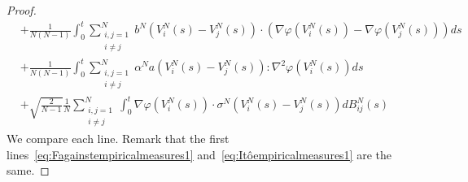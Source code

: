 \documentclass[10pt,a4paper]{amsart}
\begin{document}
\begin{proof}
\begin{align}
       &+ \frac{1}{N(N-1)}\int_0^t \sum_{\substack{i,j=1\\ i\neq j}}^N  b^N\left(V^N_i(s) -V^N_j(s)\right) \cdot (\nabla\varphi\left(V^N_i(s)\right)-\nabla\varphi\left(V^N_j(s)\right)) ds\ \\
       \label{eq:Itôempiricalmeasures3}
       &+ \frac{1}{N(N-1)} \int_0^t \sum_{\substack{i,j=1\\ i\neq j}}^N  \alpha^Na\left(V^N_i(s) -V^N_j(s)\right):\nabla^2\varphi\left(V^N_i(s)\right)ds\\
       \label{eq:Itôempiricalmeasures4}
       &+\sqrt{\frac{2}{N-1}}\frac{1}{N}\sum_{\substack{i,j=1\\ i\neq j}}^N \int_0^t  \nabla \varphi\left(V^N_i(s)\right)\cdot \sigma^N \left(V^N_i(s) - V^N_j(s)\right)dB^N_{ij}(s)
    \end{align}
    We compare each line. Remark that the first lines~\eqref{eq:Fagainstempiricalmeasures1} and~\eqref{eq:Itôempiricalmeasures1} are the same.
    

\end{proof}
\end{document}
